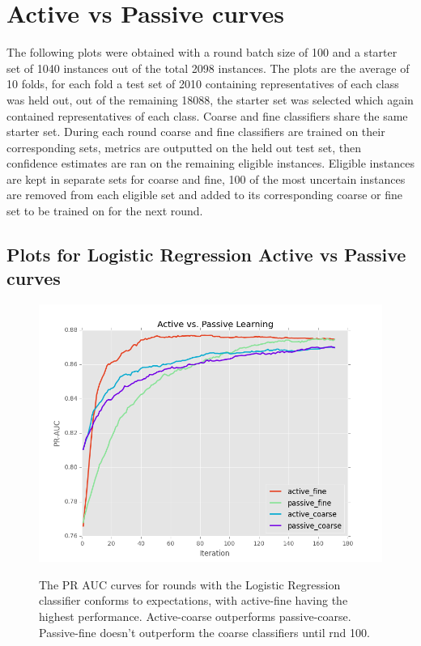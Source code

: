 \documentclass[ms]{nuthesis}
\begin{document}
\section{Active vs Passive curves}
\par The following plots were obtained with a round batch size of 100
and a starter set of 1040 instances out of the total 2098 instances.
The plots are the average of 10 folds, for each fold a test set of 2010
containing representatives of each class was held out, out of the remaining
18088, the starter set was selected which again contained representatives of
each class. Coarse and fine classifiers share the same starter set. During
 each round coarse and fine classifiers are trained on their corresponding
 sets, metrics are outputted on the held out test set, then confidence estimates
 are ran on the remaining eligible instances. Eligible instances are kept in
 separate sets for coarse and fine, 100 of the most uncertain instances are removed
 from each eligible set and added to its corresponding coarse or fine set to be
 trained on for the next round.


\FloatBarrier
\subsection{Plots for Logistic Regression Active vs Passive curves}
\begin{figure}[!htb]
	\centering
    \includegraphics[width=1.0\columnwidth]{fig/runActPassLogReg_pr}
    \label{fig:ActiveVsPassivePRLR}
    \caption{The PR AUC curves for rounds with the Logistic
Regression classifier conforms to expectations, with active-fine having
the highest performance. Active-coarse outperforms passive-coarse. Passive-fine
doesn't outperform the coarse classifiers until rnd 100. }
\end{figure}
\FloatBarrier
\end{document}
